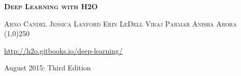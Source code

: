 











\thispagestyle{empty} %

\begin{center}
\textsc{\Large\bf{Deep Learning with H2O}}


\bigskip
\textsc{\small{Arno Candel \hspace{40pt} Jessica Lanford \hspace{40pt} Erin LeDell \hspace{40pt} Viraj Parmar \hspace{40pt} Anisha Arora \hspace{40pt} } }
\\
\bigskip
\line(1,0){250}  %

{\url{http://h2o.gitbooks.io/deep-learning/}}


\bigskip
August 2015: Third Edition 
\\%
\bigskip
\end{center}

